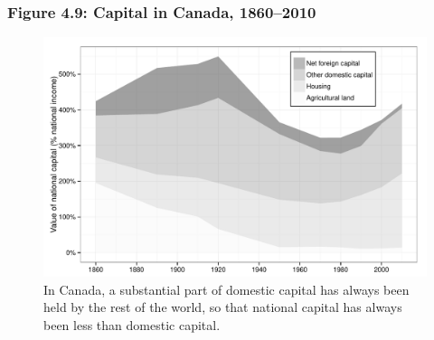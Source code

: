 \documentclass[t]{beamer}\usepackage[]{graphicx}\usepackage[]{color}
\newenvironment{knitrout}{}{} %
\begin{document}
\begin{frame}[label=Figure_4_9]
\frametitle{Figure 4.9: Capital in Canada, 1860--2010}
\begin{figure}[t]
\begin{minipage}[b]{\textwidth}
\centering
\begin{knitrout}\footnotesize
{}\color{fgcolor}

{\centering \includegraphics[width=1\linewidth]{figures/bw/Figure_4_9} 

}



\end{knitrout}
\caption{In Canada, a substantial part of domestic capital has always been held by the rest of the world, so that national capital has always been less than domestic capital.}
\end{minipage}
\end{figure}
\end{frame}
\end{document}
